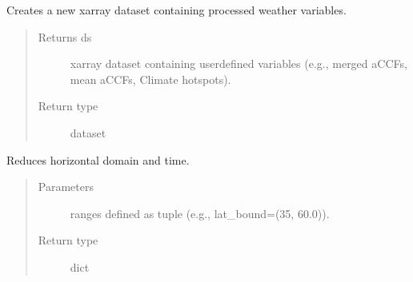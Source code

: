 \documentclass[a4paper,11pt,english]{sphinxmanual}
\begin{document}
\begin{fulllineitems}
\begin{fulllineitems}
\label{\detokenize{modules:envlib.weather_store.WeatherStore.get_xarray}}
Creates a new xarray dataset containing processed weather variables.
\begin{quote}\begin{description}
\item[{Returns ds}] \leavevmode
xarray dataset containing user\sphinxhyphen{}defined variables (e.g., merged aCCFs, mean aCCFs, Climate hotspots).

\item[{Return type}] \leavevmode
dataset

\end{description}\end{quote}

\end{fulllineitems}


\begin{fulllineitems}
\label{\detokenize{modules:envlib.weather_store.WeatherStore.reduce_domain}}
Reduces horizontal domain and time.
\begin{quote}\begin{description}
\item[{Parameters}] \leavevmode
{} \textendash{} ranges defined as tuple (e.g., lat\_bound=(35, 60.0)).

\item[{Return type}] \leavevmode
dict

\end{description}\end{quote}

\end{fulllineitems}


\end{fulllineitems}

\label{\detokenize{modules:module-envlib.weather_store}}
\end{document}
